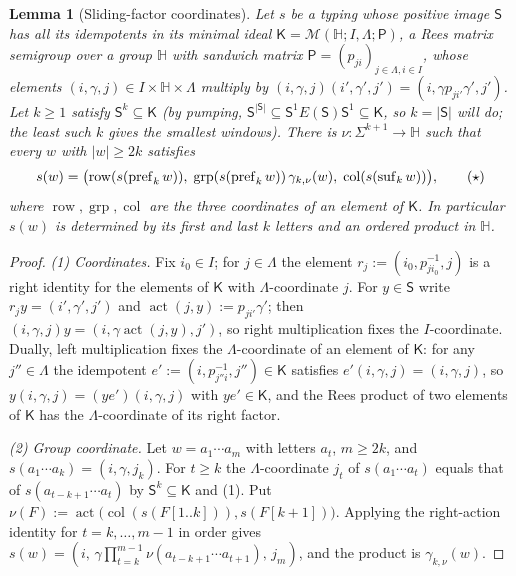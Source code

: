 \documentclass[11pt]{article}
\numberwithin{equation}{section}
\theoremstyle{plain}
\newtheorem{lemma}[theorem]{Lemma}
\theoremstyle{definition}
\theoremstyle{remark}
\theoremstyle{plain}
\begin{document}
\begin{lemma}[Sliding-factor coordinates]
\label{lem:lg-rees-window-coordinate}
Let $s$ be a typing whose positive image $\mathsf S$ has all its idempotents in its minimal
ideal $\mathsf K=\mathcal M({\mathbb H};I,\Lambda;\mathsf P)$, a Rees matrix semigroup over a group
${\mathbb H}$ with sandwich matrix $\mathsf P=(p_{ji})_{j\in\Lambda,i\in I}$, whose elements
$(i,\gamma,j)\in I\times{\mathbb H}\times\Lambda$ multiply by
$(i,\gamma,j)(i',\gamma',j')=(i,\gamma p_{ji'}\gamma',j')$.  Let $k\ge1$ satisfy
$\mathsf S^k\subseteq\mathsf K$ (by pumping,
$\mathsf S^{|\mathsf S|}\subseteq\mathsf S^1E(\mathsf S)\mathsf S^1\subseteq\mathsf K$, so $k=|\mathsf S|$ will do;
the least such $k$ gives the smallest windows).  There is
$\nu:\Sigma^{k+1}\to {\mathbb H}$ such that every $w$ with $|w|\ge2k$ satisfies
\[
 s(w)=\bigl(\operatorname{row}(s(\operatorname{pref}_kw)),\;
 \operatorname{grp}(s(\operatorname{pref}_kw))\,\gamma_{k,\nu}(w),\;
 \operatorname{col}(s(\operatorname{suf}_kw))\bigr),
 \tag{\ensuremath{\star}}
\]
where $\operatorname{row},\operatorname{grp},\operatorname{col}$ are the three coordinates of
an element of $\mathsf K$.  In particular $s(w)$ is determined by its first and last
$k$ letters and an ordered product in ${\mathbb H}$.
\end{lemma}

\begin{proof}
\emph{(1) Coordinates.}  Fix $i_0\in I$; for $j\in\Lambda$ the element
$r_j:=(i_0,p_{ji_0}^{-1},j)$ is a right identity for the elements of $\mathsf K$ with
$\Lambda$-coordinate $j$.  For $y\in \mathsf S$ write $r_jy=(i',\gamma',j')$ and
$\operatorname{act}(j,y):=p_{ji'}\gamma'$; then
$(i,\gamma,j)y=(i,\gamma\operatorname{act}(j,y),j')$, so right multiplication fixes the
$I$-coordinate.  Dually, left multiplication fixes the $\Lambda$-coordinate of an
element of $\mathsf K$: for any $j''\in\Lambda$ the idempotent
$e':=(i,p_{j''i}^{-1},j'')\in\mathsf K$ satisfies $e'(i,\gamma,j)=(i,\gamma,j)$, so
$y(i,\gamma,j)=(ye')(i,\gamma,j)$ with $ye'\in\mathsf K$, and the Rees product of two
elements of $\mathsf K$ has the $\Lambda$-coordinate of its right factor.

\emph{(2) Group coordinate.}  Let $w=a_1\cdots a_m$ with letters $a_t$, $m\ge2k$, and
$s(a_1\cdots a_k)=(i,\gamma,j_k)$.  For $t\ge k$ the $\Lambda$-coordinate $j_t$
of $s(a_1\cdots a_t)$ equals that of $s(a_{t-k+1}\cdots a_t)$ by $\mathsf S^k\subseteq\mathsf K$
and (1).  Put
$\nu(F):=\operatorname{act}\bigl(\operatorname{col}(s(F[1..k])),s(F[k+1])\bigr)$.  Applying the
right-action identity for $t=k,\ldots,m-1$ in order gives
$s(w)=(i,\,\gamma\prod_{t=k}^{m-1}\nu(a_{t-k+1}\cdots a_{t+1}),\,j_m)$, and the
product is $\gamma_{k,\nu}(w)$.
\end{proof}
\end{document}
